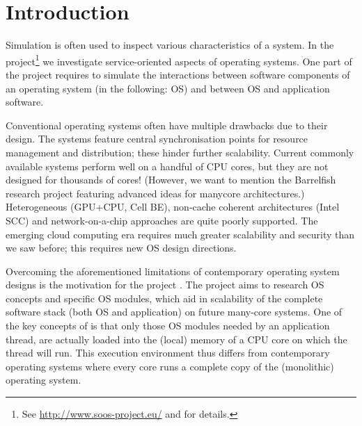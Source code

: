 \section{Introduction}

Simulation is often used to inspect various characteristics of a system.
In the \soos project\footnote{See \url{http://www.soos-project.eu/} and \cite{soos} for details.} we investigate service-oriented aspects of operating systems.
One part of the project requires to simulate the interactions between software components of an operating system (in the following: OS) and between
OS and application software.


Conventional operating systems often have multiple drawbacks due to their design.
The systems feature central synchronisation points for resource management and distribution; these hinder further scalability.
Current commonly available systems perform well on a handful of CPU cores, but they are not designed for thousands of cores!
(However, we want to mention the Barrelfish research project\nolinebreak[4]  \cite{Baumann:2009:MNO:1629575.1629579} featuring advanced ideas for manycore architectures.)
Heterogeneous (\eg GPU+CPU, Cell BE), non-cache coherent architectures (\eg Intel SCC) and network-on-a-chip approaches are quite poorly supported.
The emerging cloud computing era requires much greater scalability and security than we saw before; this requires new OS design directions.

Overcoming the aforementioned limitations of contemporary operating system designs is the motivation for the \soos project \cite{soos}.
The project aims to research OS concepts and specific OS modules, which aid in scalability of the complete software stack (both OS and application) on future many-core systems.
One of the key concepts of \soos is that only those OS modules needed by an application thread, are actually loaded into the (local) memory of a CPU core on which the thread will run.
This execution environment thus differs from contemporary operating systems where every core runs a complete copy of the (monolithic) operating system.

